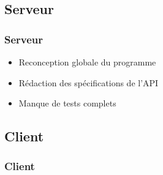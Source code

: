 \subsection{Serveur}
	\begin{frame}
		\frametitle{Serveur}
        \begin{itemize}
            \item Reconception globale du programme \newline
            \item Rédaction des spécifications de l'API \newline
            \item Manque de tests complets \newline
        \end{itemize}
	\end{frame}

\subsection{Client}
	\begin{frame}
		\frametitle{Client}
	\end{frame}
